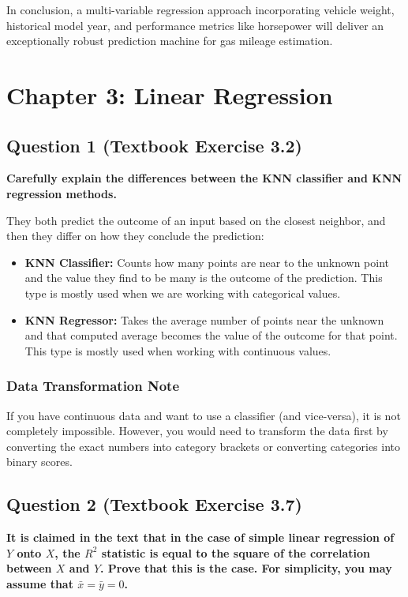 \documentclass[12pt,a4paper]{article}
\begin{document}
In conclusion, a multi-variable regression approach incorporating vehicle weight, historical model year, and performance metrics like horsepower will deliver an exceptionally robust prediction machine for gas mileage estimation.

\newpage
\section*{Chapter 3: Linear Regression}

\subsection*{Question 1 (Textbook Exercise 3.2)}

\textbf{Carefully explain the differences between the KNN classifier and KNN regression methods.}

They both predict the outcome of an input based on the closest neighbor, and then they differ on how they conclude the prediction:

\begin{itemize}
\item \textbf{KNN Classifier:} Counts how many points are near to the unknown point and the value they find to be many is the outcome of the prediction. This type is mostly used when we are working with categorical values.
\item \textbf{KNN Regressor:} Takes the average number of points near the unknown and that computed average becomes the value of the outcome for that point. This type is mostly used when working with continuous values.
\end{itemize}

\subsubsection*{Data Transformation Note}

If you have continuous data and want to use a classifier (and vice-versa), it is not completely impossible. However, you would need to transform the data first by converting the exact numbers into category brackets or converting categories into binary scores.

\subsection*{Question 2 (Textbook Exercise 3.7)}

\textbf{It is claimed in the text that in the case of simple linear regression of $Y$ onto $X$, the $R^2$ statistic is equal to the square of the correlation between $X$ and $Y$. Prove that this is the case. For simplicity, you may assume that $\bar{x}=\bar{y}=0$.}
\end{document}
